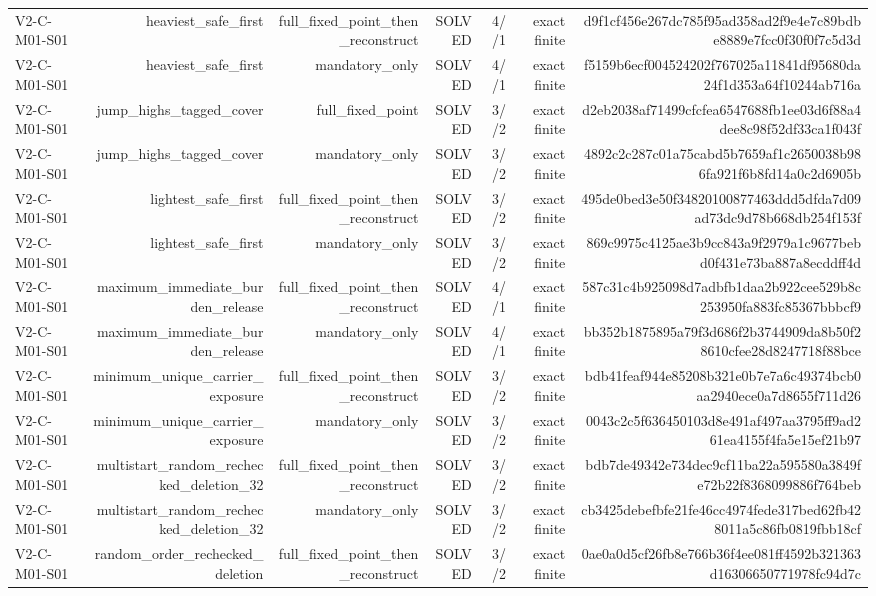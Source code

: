 {\begin{longtable}{lrrrrrr}
V2-C-M01-S01 & heaviest\_safe\_first & full\_fixed\_point\_then\_reconstruct & SOLVED & 4//1 & exact finite & d9f1cf456e267dc785f95ad358ad2f9e4e7c89bdbe8889e7fcc0f30f0f7c5d3d \\
V2-C-M01-S01 & heaviest\_safe\_first & mandatory\_only & SOLVED & 4//1 & exact finite & f5159b6ecf004524202f767025a11841df95680da24f1d353a64f10244ab716a \\
V2-C-M01-S01 & jump\_highs\_tagged\_cover & full\_fixed\_point & SOLVED & 3//2 & exact finite & d2eb2038af71499cfcfea6547688fb1ee03d6f88a4dee8c98f52df33ca1f043f \\
V2-C-M01-S01 & jump\_highs\_tagged\_cover & mandatory\_only & SOLVED & 3//2 & exact finite & 4892c2c287c01a75cabd5b7659af1c2650038b986fa921f6b8fd14a0c2d6905b \\
V2-C-M01-S01 & lightest\_safe\_first & full\_fixed\_point\_then\_reconstruct & SOLVED & 3//2 & exact finite & 495de0bed3e50f34820100877463ddd5dfda7d09ad73dc9d78b668db254f153f \\
V2-C-M01-S01 & lightest\_safe\_first & mandatory\_only & SOLVED & 3//2 & exact finite & 869c9975c4125ae3b9cc843a9f2979a1c9677bebd0f431e73ba887a8ecddff4d \\
V2-C-M01-S01 & maximum\_immediate\_burden\_release & full\_fixed\_point\_then\_reconstruct & SOLVED & 4//1 & exact finite & 587c31c4b925098d7adbfb1daa2b922cee529b8c253950fa883fc85367bbbcf9 \\
V2-C-M01-S01 & maximum\_immediate\_burden\_release & mandatory\_only & SOLVED & 4//1 & exact finite & bb352b1875895a79f3d686f2b3744909da8b50f28610cfee28d8247718f88bce \\
V2-C-M01-S01 & minimum\_unique\_carrier\_exposure & full\_fixed\_point\_then\_reconstruct & SOLVED & 3//2 & exact finite & bdb41feaf944e85208b321e0b7e7a6c49374bcb0aa2940ece0a7d8655f711d26 \\
V2-C-M01-S01 & minimum\_unique\_carrier\_exposure & mandatory\_only & SOLVED & 3//2 & exact finite & 0043c2c5f636450103d8e491af497aa3795ff9ad261ea4155f4fa5e15ef21b97 \\
V2-C-M01-S01 & multistart\_random\_rechecked\_deletion\_32 & full\_fixed\_point\_then\_reconstruct & SOLVED & 3//2 & exact finite & bdb7de49342e734dec9cf11ba22a595580a3849fe72b22f8368099886f764beb \\
V2-C-M01-S01 & multistart\_random\_rechecked\_deletion\_32 & mandatory\_only & SOLVED & 3//2 & exact finite & cb3425debefbfe21fe46cc4974fede317bed62fb428011a5c86fb0819fbb18cf \\
V2-C-M01-S01 & random\_order\_rechecked\_deletion & full\_fixed\_point\_then\_reconstruct & SOLVED & 3//2 & exact finite & 0ae0a0d5cf26fb8e766b36f4ee081ff4592b321363d16306650771978fc94d7c \\

\end{longtable}}
